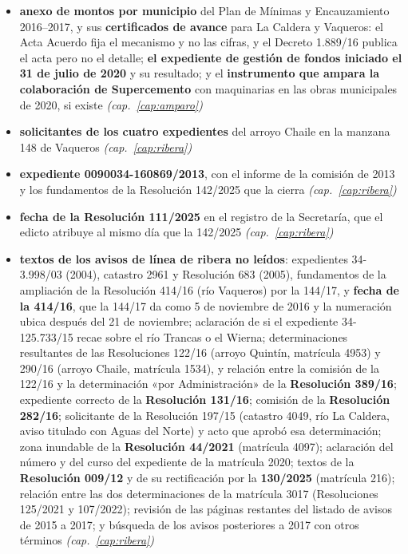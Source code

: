 \begin{itemize}[leftmargin=*]
(identificadores 3, 6 y 10 a 13); y los dos estudios inéditos de 2008 y 2009 que el informe
declara entre sus fuentes \textit{(cap.\ \ref{cap:amparo})}
\item \textbf{anexo de montos por municipio} del Plan de Mínimas y Encauzamiento
2016--2017, y sus \textbf{certificados de avance} para La Caldera y Vaqueros: el Acta Acuerdo
fija el mecanismo y no las cifras, y el Decreto 1.889/16 publica el acta pero no el detalle;
\textbf{el expediente de gestión de fondos iniciado el 31 de julio de 2020} y su resultado; y
el \textbf{instrumento que ampara la colaboración de Supercemento} con maquinarias en las obras
municipales de 2020, si existe \textit{(cap.\ \ref{cap:amparo})}
\item \textbf{solicitantes de los cuatro expedientes} del arroyo Chaile en la manzana 148 de Vaqueros \textit{(cap.\ \ref{cap:ribera})}
\item \textbf{expediente 0090034-160869/2013}, con el informe de la comisión de 2013 y los fundamentos de la Resolución 142/2025 que la cierra \textit{(cap.\ \ref{cap:ribera})}
\item \textbf{fecha de la Resolución 111/2025} en el registro de la Secretaría, que el edicto atribuye al mismo día que la 142/2025 \textit{(cap.\ \ref{cap:ribera})}
\item \textbf{textos de los avisos de línea de ribera no leídos}: expedientes 34-3.998/03 (2004), catastro 2961 y Resolución 683 (2005), fundamentos de la ampliación de la Resolución 414/16 (río Vaqueros) por la 144/17, y \textbf{fecha de la 414/16}, que la 144/17 da como 5 de noviembre de 2016 y la numeración ubica después del 21 de noviembre; aclaración de si el expediente 34-125.733/15 recae sobre el río Trancas o el Wierna; determinaciones resultantes de las Resoluciones 122/16 (arroyo Quintín, matrícula 4953) y 290/16 (arroyo Chaile, matrícula 1534), y relación entre la comisión de la 122/16 y la determinación «por Administración» de la \textbf{Resolución 389/16}; expediente correcto de la \textbf{Resolución 131/16}; comisión de la \textbf{Resolución 282/16}; solicitante de la Resolución 197/15 (catastro 4049, río La Caldera, aviso titulado con Aguas del Norte) y acto que aprobó esa determinación; zona inundable de la \textbf{Resolución 44/2021} (matrícula 4097); aclaración del número y del curso del expediente de la matrícula 2020; textos de la \textbf{Resolución 009/12} y de su rectificación por la \textbf{130/2025} (matrícula 216); relación entre las dos determinaciones de la matrícula 3017 (Resoluciones 125/2021 y 107/2022); revisión de las páginas restantes del listado de avisos de 2015 a 2017; y búsqueda de los avisos posteriores a 2017 con otros términos \textit{(cap.\ \ref{cap:ribera})}

\end{itemize}
